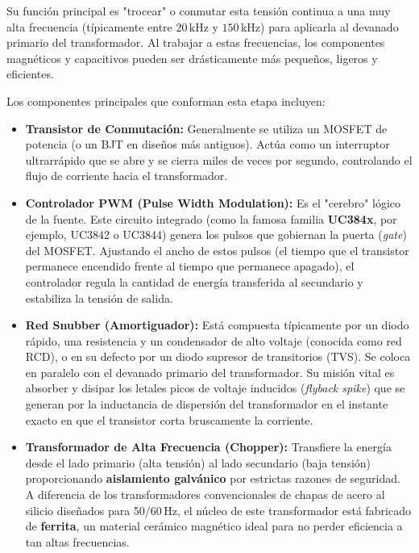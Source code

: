 \documentclass[12pt, a4paper]{article}
\begin{document}
Su función principal es "trocear" o conmutar esta tensión continua a una muy alta frecuencia (típicamente entre $20\,\text{kHz}$ y $150\,\text{kHz}$) para aplicarla al devanado primario del transformador. Al trabajar a estas frecuencias, los componentes magnéticos y capacitivos pueden ser drásticamente más pequeños, ligeros y eficientes.

Los componentes principales que conforman esta etapa incluyen:

\begin{itemize}[itemsep=1.5ex]
    \item \textbf{Transistor de Conmutación:} Generalmente se utiliza un MOSFET de potencia (o un BJT en diseños más antiguos). Actúa como un interruptor ultrarrápido que se abre y se cierra miles de veces por segundo, controlando el flujo de corriente hacia el transformador.
    
    \item \textbf{Controlador PWM (Pulse Width Modulation):} Es el "cerebro" lógico de la fuente. Este circuito integrado (como la famosa familia \textbf{UC384x}, por ejemplo, UC3842 o UC3844) genera los pulsos que gobiernan la puerta (\textit{gate}) del MOSFET. Ajustando el ancho de estos pulsos (el tiempo que el transistor permanece encendido frente al tiempo que permanece apagado), el controlador regula la cantidad de energía transferida al secundario y estabiliza la tensión de salida.
    
    \item \textbf{Red Snubber (Amortiguador):} Está compuesta típicamente por un diodo rápido, una resistencia y un condensador de alto voltaje (conocida como red RCD), o en su defecto por un diodo supresor de transitorios (TVS). Se coloca en paralelo con el devanado primario del transformador. Su misión vital es absorber y disipar los letales picos de voltaje inducidos (\textit{flyback spike}) que se generan por la inductancia de dispersión del transformador en el instante exacto en que el transistor corta bruscamente la corriente.
    
    \item \textbf{Transformador de Alta Frecuencia (Chopper):} Transfiere la energía desde el lado primario (alta tensión) al lado secundario (baja tensión) proporcionando \textbf{aislamiento galvánico} por estrictas razones de seguridad. A diferencia de los transformadores convencionales de chapas de acero al silicio diseñados para 50/60\,Hz, el núcleo de este transformador está fabricado de \textbf{ferrita}, un material cerámico magnético ideal para no perder eficiencia a tan altas frecuencias.
\end{itemize}
\end{document}
